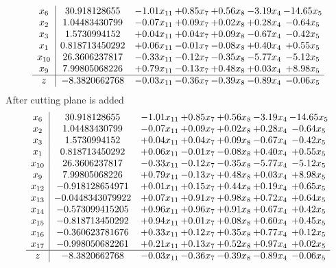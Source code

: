 \documentclass[8pt]{article}
\begin{document}
\[\begin{array}{c| c c@{\hskip 2pt} c@{\hskip 2pt} c@{\hskip 2pt} c@{\hskip 2pt} c@{\hskip 2pt} }
 x_{6}   &  30.918128655 & -1.01 x_{11} & +  0.85 x_{7} & +  0.56 x_{8} & -3.19 x_{4} & -14.65 x_{5}\\
 x_{2}   &  1.04483430799 & -0.07 x_{11} & +  0.09 x_{7} & +  0.02 x_{8} & +  0.28 x_{4} & -0.64 x_{5}\\
 x_{3}   &  1.5730994152 & +  0.04 x_{11} & +  0.04 x_{7} & +  0.09 x_{8} & -0.67 x_{4} & -0.42 x_{5}\\
 x_{1}   &  0.818713450292 & +  0.06 x_{11} & -0.01 x_{7} & -0.08 x_{8} & +  0.40 x_{4} & +  0.55 x_{5}\\
 x_{10}   &  26.3606237817 & -0.33 x_{11} & -0.12 x_{7} & -0.35 x_{8} & -5.77 x_{4} & -5.12 x_{5}\\
 x_{9}   &  7.99805068226 & +  0.79 x_{11} & -0.13 x_{7} & +  0.48 x_{8} & +  0.03 x_{4} & +  8.98 x_{5}\\
\hline
z    &  -8.3820662768 & -0.03 x_{11} & -0.36 x_{7} & -0.39 x_{8} & -0.89 x_{4} & -0.06 x_{5}\\
\end{array}\]
 After cutting plane is added 
\[\begin{array}{c| c c@{\hskip 2pt} c@{\hskip 2pt} c@{\hskip 2pt} c@{\hskip 2pt} c@{\hskip 2pt} }
 x_{6}   &  30.918128655 & -1.01 x_{11} & +  0.85 x_{7} & +  0.56 x_{8} & -3.19 x_{4} & -14.65 x_{5}\\
 x_{2}   &  1.04483430799 & -0.07 x_{11} & +  0.09 x_{7} & +  0.02 x_{8} & +  0.28 x_{4} & -0.64 x_{5}\\
 x_{3}   &  1.5730994152 & +  0.04 x_{11} & +  0.04 x_{7} & +  0.09 x_{8} & -0.67 x_{4} & -0.42 x_{5}\\
 x_{1}   &  0.818713450292 & +  0.06 x_{11} & -0.01 x_{7} & -0.08 x_{8} & +  0.40 x_{4} & +  0.55 x_{5}\\
 x_{10}   &  26.3606237817 & -0.33 x_{11} & -0.12 x_{7} & -0.35 x_{8} & -5.77 x_{4} & -5.12 x_{5}\\
 x_{9}   &  7.99805068226 & +  0.79 x_{11} & -0.13 x_{7} & +  0.48 x_{8} & +  0.03 x_{4} & +  8.98 x_{5}\\
 x_{12}   &  -0.918128654971 & +  0.01 x_{11} & +  0.15 x_{7} & +  0.44 x_{8} & +  0.19 x_{4} & +  0.65 x_{5}\\
 x_{13}   &  -0.0448343079922 & +  0.07 x_{11} & +  0.91 x_{7} & +  0.98 x_{8} & +  0.72 x_{4} & +  0.64 x_{5}\\
 x_{14}   &  -0.573099415205 & +  0.96 x_{11} & +  0.96 x_{7} & +  0.91 x_{8} & +  0.67 x_{4} & +  0.42 x_{5}\\
 x_{15}   &  -0.818713450292 & +  0.94 x_{11} & +  0.01 x_{7} & +  0.08 x_{8} & +  0.60 x_{4} & +  0.45 x_{5}\\
 x_{16}   &  -0.360623781676 & +  0.33 x_{11} & +  0.12 x_{7} & +  0.35 x_{8} & +  0.77 x_{4} & +  0.12 x_{5}\\
 x_{17}   &  -0.998050682261 & +  0.21 x_{11} & +  0.13 x_{7} & +  0.52 x_{8} & +  0.97 x_{4} & +  0.02 x_{5}\\
\hline
z    &  -8.3820662768 & -0.03 x_{11} & -0.36 x_{7} & -0.39 x_{8} & -0.89 x_{4} & -0.06 x_{5}\\
\end{array}\]
\end{document}
